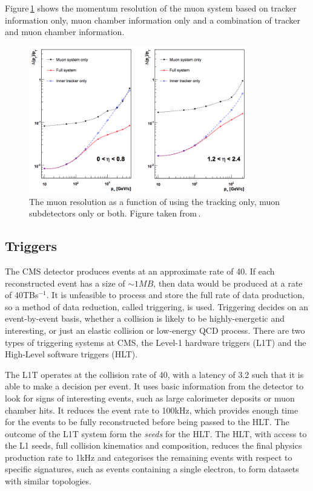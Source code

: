 Figure\,\ref{fig:CMSMuonRes} shows the momentum resolution of the muon system based on tracker information only, muon chamber information only and a combination of tracker and muon chamber information.

\begin{figure}[htpb]
	\centering
	\includegraphics[width=0.85\textwidth]{Figures/CMSMUONRES}
	\caption[The muon \pt{} resolution as a function of \pt{} using the tracking only, muon subdetectors only or both.]{The muon \pt{} resolution as a function of \pt{} using the tracking only, muon subdetectors only or both. Figure taken from\,\cite{CMSExperiment}.}
	\label{fig:CMSMuonRes}
\end{figure}

\subsection{Triggers}
\label{ssec:Trig}

The CMS detector produces events at an approximate rate of 40\MHz{}. 
If each reconstructed event has a size of $\sim 1\unit{MB}$, then data would be produced at a rate of 40\unit{TBs}$^{-1}$. 
It is unfeasible to process and store the full rate of data production, so a method of data reduction, called triggering, is used. 
Triggering decides on an event-by-event basis, whether a collision is likely to be highly-energetic and interesting, or just an elastic collision or low-energy QCD process. 
There are two types of triggering systems at CMS, the Level-1 hardware triggers (L1T) and the High-Level software triggers (HLT). 

The L1T operates at the collision rate of 40\MHz{}, with a latency of 3.2\us{} such that it is able to make a decision per event. 
It uses basic information from the detector to look for signs of interesting events, such as large calorimeter deposits or muon chamber hits.
It reduces the event rate to 100\unit{kHz}, which provides enough time for the events to be fully reconstructed before being passed to the HLT. 
The outcome of the L1T system form the \textit{seeds} for the HLT. 
The HLT, with access to the L1 seeds, full collision kinematics and composition, reduces the final physics production rate to 1\unit{kHz} and categorises the remaining events with respect to specific signatures, such as events containing a single electron, to form datasets with similar topologies.

